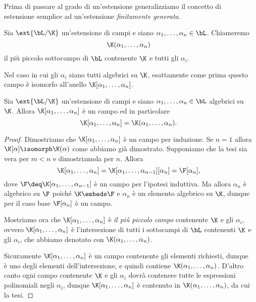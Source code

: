 Prima di passare al grado di un'estensione generalizziamo il concetto di estensione semplice ad un'estensione \emph{finitamente generata}.
\begin{definition}
    Sia $\ext{\bL / \K}$ un'estensione di campi e siano $\alpha_1, \dots, \alpha_n \in \bL$. Chiameremo \[
        \K(\alpha_1, \dots, \alpha_n)
    \] il più piccolo sottocampo di $\bL$ contenente $\K$ e tutti gli $\alpha_i$. 
\end{definition}

Nel caso in cui gli $\alpha_i$ siano tutti algebrici su $\K$, esattamente come prima questo campo è isomorfo all'anello $\K[\alpha_1, \dots, \alpha_n]$.
\begin{proposition}
    {}{}
    Sia $\ext{\bL / \K}$ un'estensione di campi e siano $\alpha_1, \dots, \alpha_n \in \bL$ algebrici su $\K$. Allora $\K[\alpha_1, \dots, \alpha_n]$ è un campo ed in particolare \[
        \K[\alpha_1, \dots, \alpha_n] = \K(\alpha_1, \dots, \alpha_n).
    \]
\end{proposition} 
\begin{proof}
    Dimostriamo che $\K[\alpha_1, \dots, \alpha_n]$ è un campo per induzione.
     Se $n = 1$ allora $\K[\alpha] \isomorph \K(\alpha)$ come abbiamo già dimostrato.
     Supponiamo che la tesi sia vera per $m < n$ e dimostriamola per $n$. Allora \[
        \K[\alpha_1, \dots, \alpha_n] = \K[\alpha_1, \dots, \alpha_{n-1}][\alpha_n] = \F[\alpha_n],
    \] dove $\F \deq \K[\alpha_1, \dots, \alpha_{n-1}]$ è un campo per l'ipotesi induttiva. Ma allora $\alpha_n$ è algebrico su $\F$ poiché $\K \embeds \F$ e $\alpha_n$ è un elemento algebrico su $\K$, dunque per il caso base $\F[\alpha_n]$ è un campo.
    
    Mostriamo ora che $\K[\alpha_1, \dots, \alpha_n]$ è \emph{il più piccolo campo} contenente $\K$ e gli $\alpha_i$, ovvero $\K[\alpha_1, \dots, \alpha_n]$ è l'intersezione di tutti i sottocampi di $\bL$ contenenti $\K$ e gli $\alpha_i$, che abbiamo denotato con $\K(\alpha_1, \dots, \alpha_n)$.
    
    Sicuramente $\K[\alpha_1, \dots, \alpha_n]$ è un campo contenente gli elementi richiesti, dunque è uno degli elementi dell'intersezione, e quindi contiene $\K(\alpha_1, \dots, \alpha_n)$. D'altro canto ogni campo contenente $\K$ e gli $\alpha_i$ dovrà contenere tutte le espressioni polinomiali negli $\alpha_i$, dunque $\K[\alpha_1, \dots, \alpha_n]$ è contenuto in $\K(\alpha_1, \dots, \alpha_n)$, da cui la tesi.    
\end{proof}

